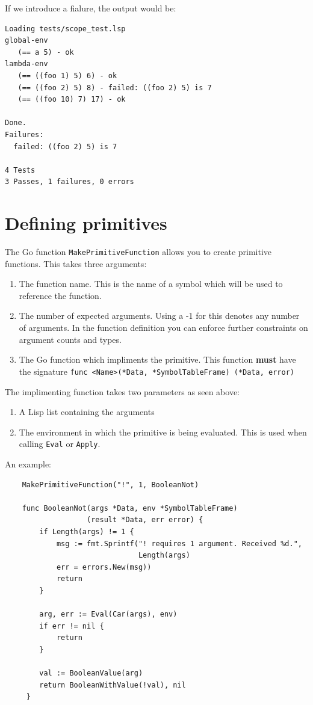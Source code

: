 \documentclass[12pt]{article}
\begin{document}
If we introduce a fialure, the output would be:

\begin{verbatim}
Loading tests/scope_test.lsp
global-env
   (== a 5) - ok
lambda-env
   (== ((foo 1) 5) 6) - ok
   (== ((foo 2) 5) 8) - failed: ((foo 2) 5) is 7
   (== ((foo 10) 7) 17) - ok

Done.
Failures:
  failed: ((foo 2) 5) is 7

4 Tests
3 Passes, 1 failures, 0 errors
\end{verbatim}
\section{Defining primitives}

The Go function \verb|MakePrimitiveFunction| allows you to create
primitive functions. This takes three arguments:

\begin{enumerate}
\item The function name. This is the name of a symbol which will be
  used to reference the function. 
\item The number of expected arguments. Using a -1 for this denotes
  any number of arguments. In the function definition you can enforce
  further constraints on argument counts and types. 
\item The Go function which impliments the primitive. This function
  {\bf must} have the signature
  \verb|func <Name>(*Data, *SymbolTableFrame) (*Data, error)| 
\end{enumerate}

\noindent The implimenting function takes two parameters as seen
above:

\begin{enumerate}
\item A Lisp list containing the arguments
\item The environment in which the primitive
  is being evaluated. This is used when calling \verb|Eval| or \verb|Apply|.
\end{enumerate}

\noindent An example:

\begin{verbatim}
    MakePrimitiveFunction("!", 1, BooleanNot)

    func BooleanNot(args *Data, env *SymbolTableFrame) 
                   (result *Data, err error) {
        if Length(args) != 1 {
            msg := fmt.Sprintf("! requires 1 argument. Received %d.", 
                               Length(args)
            err = errors.New(msg))
            return
        }

        arg, err := Eval(Car(args), env)
        if err != nil {
            return
        }

        val := BooleanValue(arg)
        return BooleanWithValue(!val), nil
     }
\end{verbatim}
\end{document}
